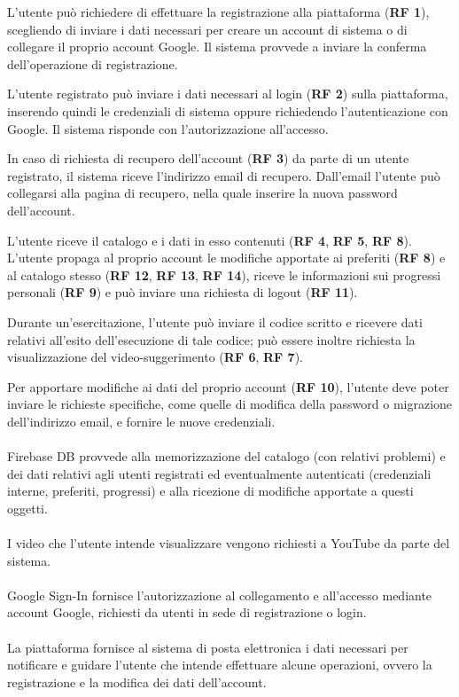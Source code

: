 \documentclass[11pt, a4paper]{article}
\theoremstyle{definition} %
\begin{document}
L'utente può richiedere di effettuare la registrazione alla piattaforma
(\textbf{RF 1}), scegliendo di inviare i dati necessari per creare un
account di sistema o di collegare il proprio account Google. Il sistema
provvede a inviare la conferma dell'operazione di registrazione.

L'utente registrato può inviare i dati necessari al login (\textbf{RF 2}) sulla piattaforma,
inserendo quindi le credenziali di sistema oppure richiedendo l'autenticazione
con Google. Il sistema risponde con l'autorizzazione all'accesso.

In caso di richiesta di recupero dell'account (\textbf{RF 3}) da parte di un utente
registrato, il sistema riceve l'indirizzo email di recupero. Dall'email
l'utente può collegarsi alla pagina di recupero, nella quale inserire la
nuova password dell'account.

L'utente riceve il catalogo e i dati in esso contenuti (\textbf{RF 4}, \textbf{RF 5},
\textbf{RF 8}). L'utente propaga al proprio account le modifiche
apportate ai preferiti (\textbf{RF 8}) e al catalogo stesso (\textbf{RF 12}, \textbf{RF 13}, \textbf{RF 14}), riceve le informazioni sui progressi personali (\textbf{RF 9})
e può inviare una richiesta di logout (\textbf{RF 11}).

Durante un'esercitazione, l'utente può inviare il codice scritto e ricevere dati
relativi all'esito dell'esecuzione di tale codice; può essere inoltre richiesta la
visualizzazione del video-suggerimento (\textbf{RF 6}, \textbf{RF 7}).

Per apportare modifiche ai dati del proprio account (\textbf{RF 10}), l'utente
deve poter inviare le richieste specifiche, come quelle di modifica della password
o migrazione dell'indirizzo email, e fornire le nuove credenziali.
\\\\
Firebase DB provvede alla memorizzazione del catalogo (con relativi problemi) e dei
dati relativi agli utenti registrati ed eventualmente autenticati (credenziali
interne, preferiti, progressi) e alla ricezione di modifiche apportate a questi oggetti.
\\\\
I video che l'utente intende visualizzare vengono richiesti a YouTube da
parte del sistema.
\\\\
Google Sign-In fornisce l'autorizzazione al collegamento e all'accesso
mediante account Google, richiesti da utenti in sede di registrazione o
login.
\\\\
La piattaforma fornisce al sistema di posta elettronica i dati necessari
per notificare e guidare l'utente che intende effettuare alcune operazioni,
ovvero la registrazione e la modifica dei dati dell'account.
\end{document}
